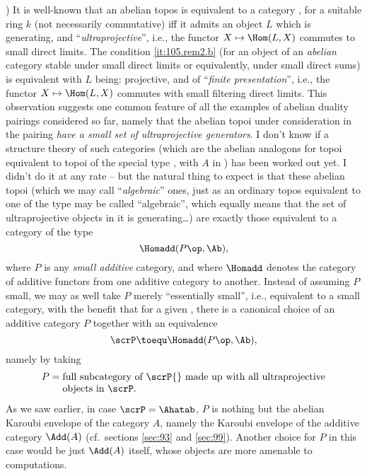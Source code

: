 )%
\enspace It is well-known that an abelian topos \scrP{} is
equivalent to a category \kMod, for a suitable ring $k$ (not
necessarily commutative) if{f} it admits an object $L$ which is
\enspace generating, and
\enspace ``\emph{ultraprojective}'',
i.e., the functor $X\mapsto\Hom(L,X)$ commutes to small direct
limits. The condition \ref{it:105.rem2.b} (for an object of an
\emph{abelian} category stable under small direct limits or
equivalently, under small direct sums) is equivalent with $L$ being:
\enspace projective,
and \enspace of
``\emph{finite presentation}'', i.e., the functor $X\mapsto\Hom(L,X)$
commutes with small filtering direct limits. This observation suggests
one common feature of all the examples of abelian duality pairings
considered so far, namely that the abelian topoi under consideration
in the pairing \emph{have a small set of ultraprojective
  generators}. I don't know if a structure theory of such categories
(which are the abelian analogons for topoi equivalent to topoi of the
special type \Ahat, with $A$ in \Cat) has been worked out yet. I
didn't do it at any rate -- but the natural thing to expect is that
these abelian topoi \scrP{} (which we may call ``\emph{algebraic}''
ones, just as an ordinary topos equivalent to one of the type \Ahat{}
may be called ``algebraic'', which equally means that the set of
ultraprojective objects in it is generating\ldots) are exactly those
equivalent to a category of the type
\[\Homadd(P\op,\Ab),\]
where $P$ is any \emph{small additive} category, and where $\Homadd$
denotes the category of additive functors from one additive category
to another. Instead of assuming $P$ small, we may as well take $P$
merely ``essentially small'', i.e., equivalent to a small category,
with the benefit that for a given \scrP, there is a canonical choice
of an additive category $P$ together with an equivalence
\[\scrP\toequ\Homadd(P\op,\Ab),\]
namely by taking
\[P =
\begin{tabular}[t]{@{}l@{}}
  full subcategory of \scrP{} made up with all
  ultraprojective\\objects in \scrP.
\end{tabular}\]
As we saw earlier, in case $\scrP=\Ahatab$, $P$ is nothing but the
abelian Karoubi envelope of the category $A$, namely the Karoubi
envelope of the additive category $\Add(A)$ (cf.\ sections
\ref{sec:93} and \ref{sec:99}). Another choice for $P$ in this case
would be just $\Add(A)$ itself, whose objects are more amenable to
computations.

